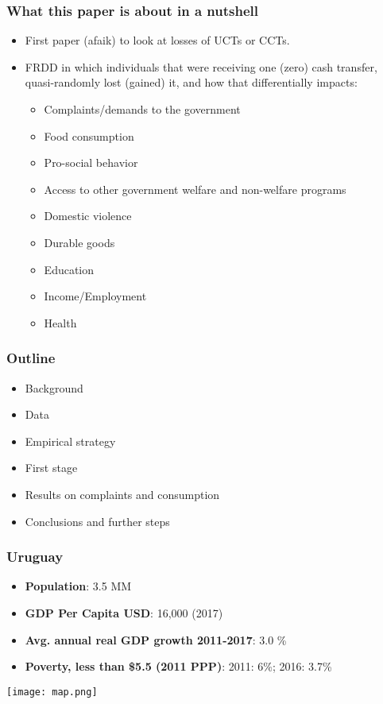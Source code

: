 \documentclass{beamer}
\begin{document}
\begin{frame}
\frametitle{What this paper is about in a nutshell}
\begin{itemize}
\item First paper (afaik) to look at losses of UCTs or CCTs.
\item FRDD in which individuals that were receiving one (zero) cash transfer, quasi-randomly lost (gained) it, and how that differentially impacts:
\begin{itemize}
	\item Complaints/demands to the government
	\item Food consumption
	\item {\color{gray}Pro-social behavior}
	\item {\color{gray}Access to other government welfare and non-welfare programs}
	\item {\color{gray}Domestic violence}
	\item {\color{gray}Durable goods}
	\item {\color{gray}Education}
	\item {\color{gray}Income/Employment}
	\item {\color{gray}Health}
\end{itemize}
\end{itemize}
\end{frame}

\begin{frame}
\frametitle{Outline}
\begin{itemize}
\item Background
\item Data
\item Empirical strategy
\item First stage
\item Results on complaints and consumption
\item Conclusions and further steps
\end{itemize}
\end{frame}

\begin{frame}
\frametitle{Uruguay}
\begin{itemize}
\item \textbf{Population}: 3.5 MM
\item \textbf{GDP Per Capita USD}: 16,000 (2017)
\item \textbf{Avg. annual real GDP growth 2011-2017}: 3.0 \%
\item \textbf{Poverty, less than \$5.5 (2011 PPP)}: 2011: 6\%; 2016: 3.7\%	
\end{itemize}
\begin{center}
	\texttt{[image: map.png]}
	\label{map}
\end{center}
\end{frame}
\end{document}
